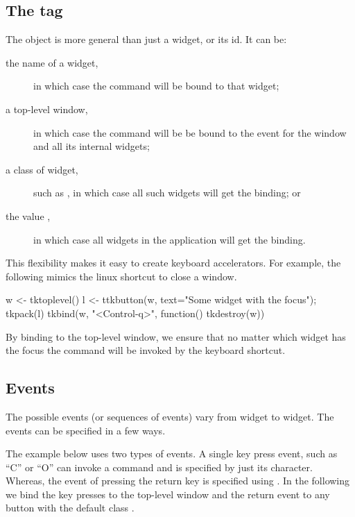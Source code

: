 \subsection{The tag}

The  object is more general than just a widget, or its
id. It can be:

\begin{description}
\item[the name of a widget,] in which case the command will be bound to that widget;
\item[a top-level window,] in which case the command will be be bound
  to the event for the window and all its internal widgets;
\item[a class of widget,] such as , in which case all
  such widgets will get the binding; or
\item[the value ,] in which case all widgets in the
  application will get the binding.
\end{description}

This flexibility makes it easy to create keyboard accelerators. For
example, the following mimics the linux shortcut  to
close a window.
\begin{Schunk}
\begin{Sinput}
 w <- tktoplevel()
 l <- ttkbutton(w, text="Some widget with the focus"); tkpack(l)
 tkbind(w, "<Control-q>", function() tkdestroy(w))
\end{Sinput}
\end{Schunk}

By binding to the top-level window, we ensure that no matter which
widget has the focus the command will be invoked by the keyboard shortcut.


\subsection{Events}
\label{sec:tcltk:events}

The possible events (or sequences of events) vary from widget to
widget. The events can be specified in a few ways. 

The example below uses two types of events. A single key press event, such as
``C'' or ``O'' can invoke a command and is specified by just its
character. Whereas, the event of pressing the return key is specified
using . In the following we bind the key presses to the
top-level window and the return event to any button with the default
class .


